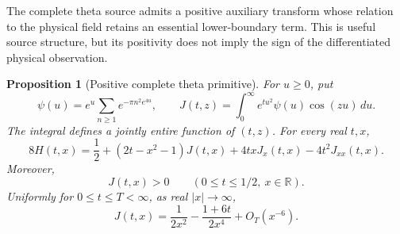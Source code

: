 \documentclass[11pt]{article}
\numberwithin{equation}{section}
\newtheorem{proposition}[theorem]{Proposition}
\theoremstyle{definition}
\theoremstyle{remark}
\newcommand{\R}{\mathbb R}
\newcommand{\dd}{\,d}
\begin{document}
The complete theta source admits a positive auxiliary transform whose
relation to the physical field retains an essential lower-boundary term.
This is useful source structure, but its positivity does not imply the
sign of the differentiated physical observation.

\begin{proposition}[Positive complete theta primitive]
\label{pp:positive-primitive}
For \(u\ge0\), put
\begin{equation}
 \psi(u)=e^u\sum_{n\ge1}e^{-\pi n^2e^{4u}},\qquad
 J(t,z)=\int_0^\infty e^{tu^2}\psi(u)\cos(zu)\dd u.
 \label{pp:primitive-definition}
\end{equation}
The integral defines a jointly entire function of \((t,z)\).
For every real \(t,x\),
\begin{equation}
 8H(t,x)=\frac12+(2t-x^2-1)J(t,x)
                    +4txJ_x(t,x)-4t^2J_{xx}(t,x).
 \label{pp:primitive-reconstruction}
\end{equation}
Moreover,
\begin{equation}
 J(t,x)>0\qquad(0\le t\le1/2,\ x\in\R).
 \label{pp:primitive-positive}
\end{equation}
Uniformly for \(0\le t\le T<\infty\), as real \(|x|\to\infty\),
\begin{equation}
 J(t,x)=\frac1{2x^2}-\frac{1+6t}{2x^4}+O_T(x^{-6}).
 \label{pp:primitive-asymptotic}
\end{equation}
\end{proposition}
\end{document}
